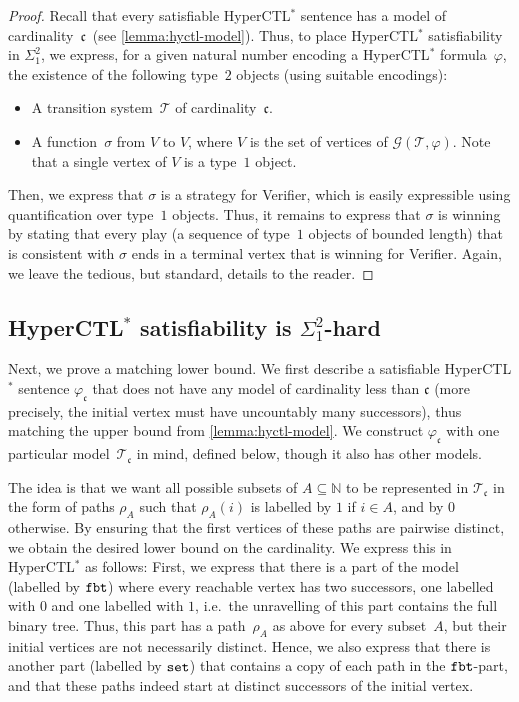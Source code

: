 \documentclass[dvipsnames,10pt,a4paper]{amsart}
\theoremstyle{definition}
\theoremstyle{remark}
\newcommand{\contcard}{\cont}
\newcommand{\mcgame}{\mathcal{G}}
\newcommand{\nats}{\mathbb{N}}
\newcommand\Nat{\nats}
\newcommand{\cont}{\mathfrak{c}}
\newcommand{\tsys}{\mathcal{T}}
\newcommand{\hyctlstar}{{HyperCTL$^*$}\xspace}
\newcommand\fbt{\textup{\texttt{fbt}}}
\newcommand\pset{\textup{\texttt{set}}}
\newcommand\phiset{\varphi_{\cont}}
\newcommand\Kset{\tsys_{\cont}}
\begin{document}
\begin{proof}
Recall that every satisfiable \hyctlstar sentence has a model of cardinality~$\contcard$~(see \autoref{lemma:hyctl-model}). 
Thus, to place \hyctlstar satisfiability in $\Sigma_1^2$, we express, for a given natural number encoding a \hyctlstar formula~$\varphi$, the existence of the following type~$2$ objects (using suitable encodings):
\begin{itemize}
	\item A transition system~$\tsys$ of cardinality~$\contcard$. 
	\item A function~$\sigma$ from $V$ to $V$, where $V$ is the set of vertices of $\mcgame(\tsys,\varphi)$. Note that a single vertex of $V$ is a type~$1$ object. 
\end{itemize}
Then, we express that $\sigma$ is a strategy for Verifier, which is easily expressible using quantification over type~$1$ objects. 
Thus, it remains to express that $\sigma$ is winning by stating that every play (a sequence of type~$1$ objects of bounded length) that is consistent with $\sigma$ ends in a terminal vertex that is winning for Verifier. 
Again, we leave the tedious, but standard, details to the reader.
\end{proof}

	
\subsection{\texorpdfstring{\hyctlstar}{HyperCTL*} satisfiability is \texorpdfstring{$\Sigma^2_1$}{Sigma21}-hard}
\label{subsec:hyctllb}

Next, we prove a matching lower bound.
We first describe a satisfiable \hyctlstar sentence $\phiset$ that does not have any model of
cardinality less than $\cont$ (more precisely, the initial vertex must have
uncountably many successors), thus matching the upper bound from
\autoref{lemma:hyctl-model}.
We construct $\phiset$ with one particular model~$\Kset$ in mind,
defined below, though it also has other models.

The idea is that we want all possible subsets of $A \subseteq \Nat$ to
be represented in $\Kset$ in the form of paths
$\rho_A$ such that $\rho_A(i)$ is labelled by $1$ if $i \in A$, and by $0$ otherwise.
By ensuring that the first vertices of these paths are pairwise distinct, we obtain the desired lower bound on the cardinality.
We express this in \hyctlstar as follows: First, we express that there is a part of the model (labelled by $\fbt$) where every reachable vertex has two successors, one labelled with $0$ and one labelled with $1$, i.e.\ the unravelling of this part contains the full binary tree.
Thus, this part has a path~$\rho_A$ 
as above for every subset~$A$, but their initial vertices are not necessarily distinct.
Hence, we also express that there is another part (labelled by $\pset$) that contains a copy of each path in the $\fbt$-part, and that these paths indeed start at distinct successors of the initial vertex.
\end{document}

